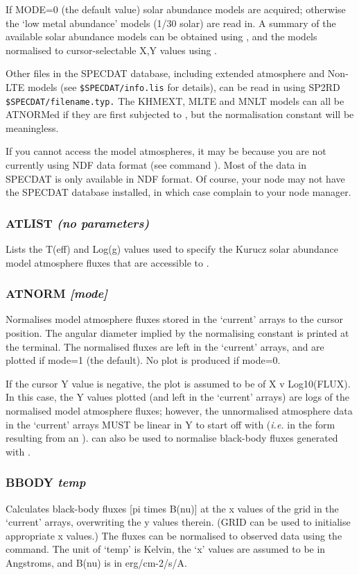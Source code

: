 \documentclass[twoside,11pt,noabs,nolof]{starlink}
\providecommand{\dipcom}[3]{\subsubsection*{\label{COM:#1}\xlabel{COM:#1}\textbf{#1} \emph{#2}}}
\begin{document}
If MODE=0 (the default value) solar abundance models are acquired;
otherwise the `low metal abundance' models (1/30 solar) are read in. A
summary of the available solar abundance models can be obtained using
,  and the models normalised to cursor-selectable X,Y values
using .

Other files in the SPECDAT database, including extended atmosphere and
Non-LTE models (see {\texttt{\$SPECDAT/info.lis}}  for details), can be read in
using SP2RD {\texttt{\$SPECDAT/file\-name.typ.}}  The KHMEXT, MLTE and MNLT
models can all be ATNORMed if they are first subjected to ,  but
the normalisation constant will be meaningless.

If you cannot access the model atmospheres, it may be because you are not
currently using NDF data format (see command ).  Most of the data in
SPECDAT is only available in NDF format. Of course, your node may not have the
SPECDAT database installed, in which case complain to your node manager.

\dipcom{ATLIST}{(no parameters)}{Lists the available Karucz model atmosphere data }
Lists the T(eff) and Log(g) values used to specify the Kurucz solar
abundance model atmosphere fluxes that are accessible to .

\dipcom{ATNORM}{[mode]}{Normalises model atmosphere fluxes}
Normalises model atmosphere fluxes stored in the `current' arrays to
the cursor position. The angular diameter implied by the normalising
constant is printed at the terminal. The normalised fluxes are left in
the `current' arrays, and are plotted if mode=1 (the default). No plot
is produced if mode=0.

If the cursor Y value is negative, the plot is assumed to be of X v
Log10(FLUX). In this case, the Y values plotted (and left in the
`current' arrays) are logs of the normalised model atmosphere fluxes;
however, the unnormalised atmosphere data in the `current' arrays MUST
be linear in Y to start off with (\emph{i.e.} in the form resulting
from an ).    can also be used to normalise black-body
fluxes generated with .

\dipcom{BBODY}{temp}{Calculates black-body fluxes at the current X values}
Calculates black-body fluxes [pi times B(nu)] at the x values of the
grid in the `current' arrays, overwriting the y values therein. (GRID
can be used to initialise appropriate x values.) The fluxes can be
normalised to observed data using the   command. The unit of
`temp' is Kelvin, the `x' values are assumed to be in Angstroms, and
B(nu) is in erg/cm-2/s/A.
\end{document}
